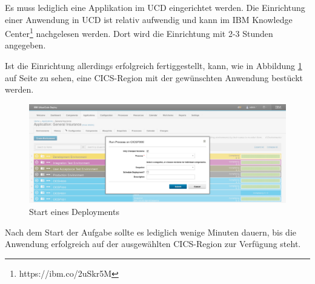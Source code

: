 Es muss lediglich eine Applikation im UCD eingerichtet werden. Die Einrichtung einer Anwendung in UCD ist relativ aufwendig
und kann im IBM Knowledge Center\footnote{https://ibm.co/2uSkr5M} nachgelesen werden. Dort wird die Einrichtung mit 2-3
Stunden angegeben.

Ist die Einrichtung allerdings erfolgreich fertiggestellt, kann, wie in Abbildung \ref{fig:ucd_start} auf Seite
\pageref{fig:ucd_start} zu sehen, eine CICS-Region mit der gewünschten Anwendung bestückt werden.

\begin{figure}[h]
  \centering
    \includegraphics[scale=0.31]{images/kapitel_3/ucd_start.pdf}
  \caption{Start eines Deployments}
  \label{fig:ucd_start}
\end{figure}

Nach dem Start der Aufgabe sollte es lediglich wenige Minuten dauern, bis die Anwendung erfolgreich auf der ausgewählten
CICS-Region zur Verfügung steht.